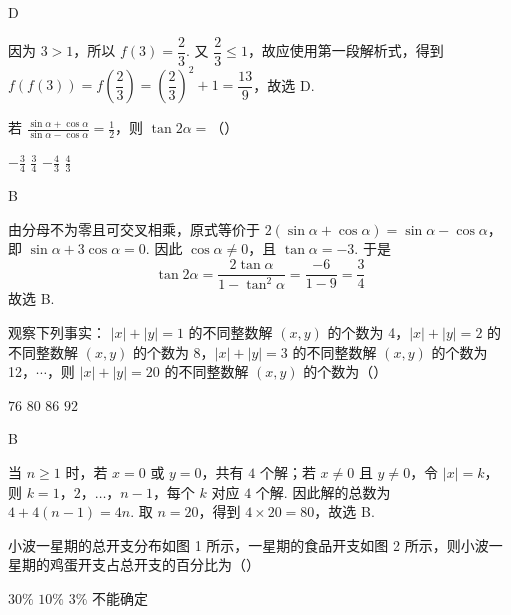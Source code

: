 \begin{answer}
D
\end{answer}

\begin{solution}
因为 \(3>1\)，所以 \(f(3)=\dfrac{2}{3}\). 又
\(\dfrac{2}{3}\leqslant1\)，故应使用第一段解析式，得到
\(f(f(3))=f\left(\dfrac{2}{3}\right)=\left(\dfrac{2}{3}\right)^2+1=\dfrac{13}{9}\)，故选 D.
\end{solution}

\begin{problem}
若 \(\frac{\sin\alpha + \cos\alpha}{\sin\alpha - \cos\alpha} = \frac{1}{2}\)，则 \(\tan 2\alpha =\)（\quad）

\choices
    {\(-\frac{3}{4}\)}
    {\( \frac{3}{4} \)}
    {\(-\frac{4}{3}\)}
    {\(\frac{4}{3}\)}
\end{problem}

\begin{answer}
    B
    \end{answer}

\begin{solution}
由分母不为零且可交叉相乘，原式等价于
\(2(\sin\alpha+\cos\alpha)=\sin\alpha-\cos\alpha\)，即
\(\sin\alpha+3\cos\alpha=0\). 因此 \(\cos\alpha\neq0\)，且
\(\tan\alpha=-3\). 于是
\[
\tan2\alpha=\frac{2\tan\alpha}{1-\tan^2\alpha}
 =\frac{-6}{1-9}=\frac{3}{4}
\]
故选 B.
\end{solution}

\begin{problem}
观察下列事实： \(|x| + |y| = 1\) 的不同整数解 \((x, y)\) 的个数为 4，\(|x| + |y| = 2\) 的不同整数解 \((x, y)\) 的个数为 8，\(|x| + |y| = 3\) 的不同整数解 \((x, y)\) 的个数为 12，\(\cdots\)，则 \(|x| + |y| = 20\) 的不同整数解 \((x, y)\) 的个数为（\quad）

\choices
    {\(76\)}
    {\(80\)}
    {\(86\)}
    {\(92\)}
\end{problem}

\begin{answer}
B
\end{answer}

\begin{solution}
当 \(n\geqslant1\) 时，若 \(x=0\) 或 \(y=0\)，共有 \(4\) 个解；若
\(x\neq0\) 且 \(y\neq0\)，令 \(\lvert x\rvert=k\)，则
\(k=1\)，\(2\)，\(\ldots\)，\(n-1\)，每个 \(k\) 对应 \(4\) 个解. 因此解的总数为
\(4+4(n-1)=4n\). 取 \(n=20\)，得到 \(4\times20=80\)，故选 B.
\end{solution}

\begin{problem}
小波一星期的总开支分布如图 1 所示，一星期的食品开支如图 2 所示，则小波一星期的鸡蛋开支占总开支的百分比为（\quad）


\choices
    {\(30\%\)}
    {\(10\%\)}
    {\(3\%\)}
    {不能确定}
\end{problem}

